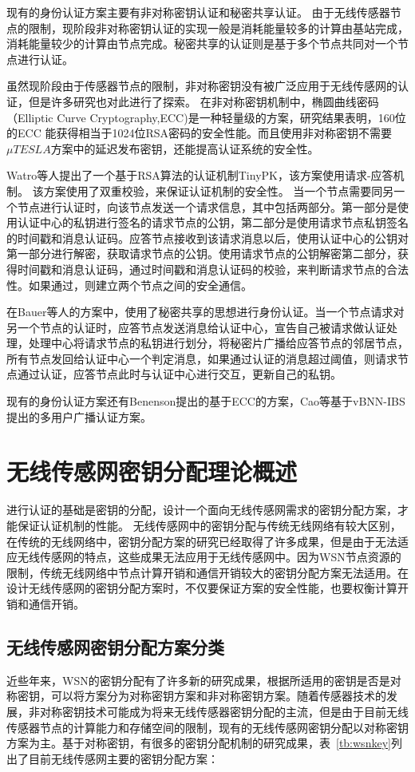 现有的身份认证方案主要有非对称密钥认证和秘密共享认证。
由于无线传感器节点的限制，现阶段非对称密钥认证的实现一般是消耗能量较多的计算由基站完成，消耗能量较少的计算由节点完成。秘密共享的认证则是基于多个节点共同对一个节点进行认证。

虽然现阶段由于传感器节点的限制，非对称密钥没有被广泛应用于无线传感网的认证，但是许多研究也对此进行了探索。
在非对称密钥机制中，椭圆曲线密码（Elliptic Curve Cryptography,ECC)是一种轻量级的方案，研究结果表明，160位的ECC 能获得相当于1024位RSA密码的安全性能。而且使用非对称密钥不需要$\mu TESLA$方案中的延迟发布密钥，还能提高认证系统的安全性。

Watro等人提出了一个基于RSA算法的认证机制TinyPK，该方案使用请求-应答机制。
该方案使用了双重校验，来保证认证机制的安全性。
当一个节点需要同另一个节点进行认证时，向该节点发送一个请求信息，其中包括两部分。第一部分是使用认证中心的私钥进行签名的请求节点的公钥，第二部分是使用请求节点私钥签名的时间戳和消息认证码。应答节点接收到该请求消息以后，使用认证中心的公钥对第一部分进行解密，获取请求节点的公钥。使用请求节点的公钥解密第二部分，获得时间戳和消息认证码，通过时间戳和消息认证码的校验，来判断请求节点的合法性。如果通过，则建立两个节点之间的安全通信。

在Bauer等人的方案中，使用了秘密共享的思想进行身份认证。当一个节点请求对另一个节点的认证时，应答节点发送消息给认证中心，宣告自己被请求做认证处理，处理中心将请求节点的私钥进行划分，将秘密片广播给应答节点的邻居节点，所有节点发回给认证中心一个判定消息，如果通过认证的消息超过阈值，则请求节点通过认证，应答节点此时与认证中心进行交互，更新自己的私钥。

现有的身份认证方案还有Benenson提出的基于ECC的方案，Cao等基于vBNN-IBS提出的多用户广播认证方案。



\section{无线传感网密钥分配理论概述}
进行认证的基础是密钥的分配，设计一个面向无线传感网需求的密钥分配方案，才能保证认证机制的性能。
无线传感网中的密钥分配与传统无线网络有较大区别，在传统的无线网络中，密钥分配方案的研究已经取得了许多成果，但是由于无法适应无线传感网的特点，这些成果无法应用于无线传感网中。因为WSN节点资源的限制，传统无线网络中节点计算开销和通信开销较大的密钥分配方案无法适用。在设计无线传感网的密钥分配方案时，不仅要保证方案的安全性能，也要权衡计算开销和通信开销。

\subsection{无线传感网密钥分配方案分类}
近些年来，WSN的密钥分配有了许多新的研究成果，根据所适用的密钥是否是对称密钥，可以将方案分为对称密钥方案和非对称密钥方案。随着传感器技术的发展，非对称密钥技术可能成为将来无线传感器密钥分配的主流，但是由于目前无线传感器节点的计算能力和存储空间的限制，现有的无线传感网密钥分配以对称密钥方案为主。基于对称密钥，有很多的密钥分配机制的研究成果，表~\ref{tb:wsnkey}列出了目前无线传感网主要的密钥分配方案：


